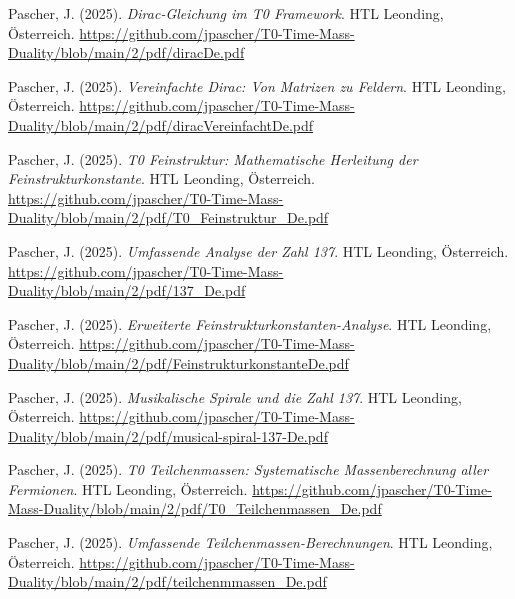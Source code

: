 \documentclass{article}
\begin{document}
\begin{thebibliography}{99}
		
		Pascher, J. (2025).
		\textit{Dirac-Gleichung im T0 Framework}.
		HTL Leonding, Österreich.
		\url{https://github.com/jpascher/T0-Time-Mass-Duality/blob/main/2/pdf/diracDe.pdf}
		
		Pascher, J. (2025).
		\textit{Vereinfachte Dirac: Von Matrizen zu Feldern}.
		HTL Leonding, Österreich.
		\url{https://github.com/jpascher/T0-Time-Mass-Duality/blob/main/2/pdf/diracVereinfachtDe.pdf}
		
		
		Pascher, J. (2025).
		\textit{T0 Feinstruktur: Mathematische Herleitung der Feinstrukturkonstante}.
		HTL Leonding, Österreich.
		\url{https://github.com/jpascher/T0-Time-Mass-Duality/blob/main/2/pdf/T0_Feinstruktur_De.pdf}
		
		Pascher, J. (2025).
		\textit{Umfassende Analyse der Zahl 137}.
		HTL Leonding, Österreich.
		\url{https://github.com/jpascher/T0-Time-Mass-Duality/blob/main/2/pdf/137_De.pdf}
		
		Pascher, J. (2025).
		\textit{Erweiterte Feinstrukturkonstanten-Analyse}.
		HTL Leonding, Österreich.
		\url{https://github.com/jpascher/T0-Time-Mass-Duality/blob/main/2/pdf/FeinstrukturkonstanteDe.pdf}
		
		Pascher, J. (2025).
		\textit{Musikalische Spirale und die Zahl 137}.
		HTL Leonding, Österreich.
		\url{https://github.com/jpascher/T0-Time-Mass-Duality/blob/main/2/pdf/musical-spiral-137-De.pdf}
		
		
		Pascher, J. (2025).
		\textit{T0 Teilchenmassen: Systematische Massenberechnung aller Fermionen}.
		HTL Leonding, Österreich.
		\url{https://github.com/jpascher/T0-Time-Mass-Duality/blob/main/2/pdf/T0_Teilchenmassen_De.pdf}
		
		Pascher, J. (2025).
		\textit{Umfassende Teilchenmassen-Berechnungen}.
		HTL Leonding, Österreich.
		\url{https://github.com/jpascher/T0-Time-Mass-Duality/blob/main/2/pdf/teilchenmmassen_De.pdf}
		

\end{thebibliography}
\end{document}
